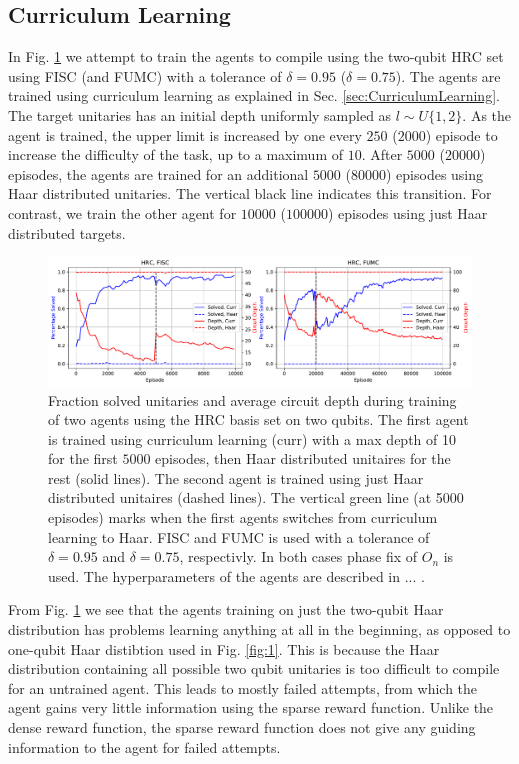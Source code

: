\documentclass[%
 aip,
 floatfix,
 amsmath,amssymb,
 reprint,%
]{revtex4-1}
\begin{document}
\subsection{Curriculum Learning}
In Fig. \ref{fig:3} we attempt to train the agents to compile using the two-qubit HRC set using FISC (and FUMC) with a tolerance of $\delta = 0.95$ ($\delta = 0.75$). The agents are trained using curriculum learning as explained in Sec. \ref{sec:CurriculumLearning}. The target unitaries has an initial depth uniformly sampled as $l \sim U\{1, 2\}$. As the agent is trained, the upper limit is increased by one every $250$ ($2000$) episode to increase the difficulty of the task, up to a maximum of $10$. After $5000$ ($20000$) episodes, the agents are trained for an additional $5000$ ($80000$) episodes using Haar distributed unitaries. The vertical black line indicates this transition. For contrast, we train the other agent for $10000$ ($100000$) episodes using just Haar distributed targets. 

\begin{figure}[h]
\includegraphics[width=1\textwidth]{../figures/two_qubit_HRC_curriculum}
\caption{Fraction solved unitaries and average circuit depth during training of two agents using the HRC basis set on two qubits. The first agent is trained using curriculum learning (curr) with a max depth of 10 for the first $5000$ episodes, then Haar distributed unitaires for the rest (solid lines). The second agent is trained using just Haar distributed unitaires (dashed lines). The vertical green line (at 5000 episodes) marks when the first agents switches from curriculum learning to Haar. FISC and FUMC is used with a tolerance of $\delta = 0.95$ and $\delta = 0.75$, respectivly. In both cases phase fix of $O_n$ is used. The hyperparameters of the agents are described in ... .} \label{fig:3}
\end{figure}

From Fig. \ref{fig:3} we see that the agents training on just the two-qubit Haar distribution has problems learning anything at all in the beginning, as opposed to one-qubit Haar distibtion used in Fig. \ref{fig:1}. This is because the Haar distribution containing all possible two qubit unitaries is too difficult to compile for an untrained agent. This leads to mostly failed attempts, from which the agent gains very little information using the sparse reward function. Unlike the dense reward function, the sparse reward function does not give any guiding information to the agent for failed attempts.
\end{document}
